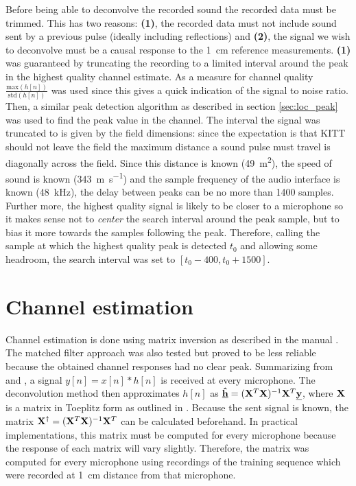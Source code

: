 \documentclass[11pt,titlepage]{report}
\begin{document}
Before being able to deconvolve the recorded sound the recorded data must be trimmed. This has two reasons: \textbf{(1)}, the recorded data must not include sound sent by a previous pulse (ideally including reflections) and \textbf{(2)}, the signal we wish to deconvolve must be a causal response to the \SI{1}{\centi\meter} reference measurements. \textbf{(1)} was guaranteed by truncating the recording to a limited interval around the peak in the highest quality channel estimate. As a measure for channel quality $\frac{\text{max}(h[n])}{\text{std}(h[n])}$ was used since this gives a quick indication of the signal to noise ratio. Then, a similar peak detection algorithm as described in section \ref{sec:loc_peak} was used to find the peak value in the channel. The interval the signal was truncated to is given by the field dimensions: since the expectation is that KITT should not leave the field the maximum distance a sound pulse must travel is diagonally across the field. Since this distance is known (\SI{49}{\meter\squared}), the speed of sound is known (\SI{343}{\meter\per\second}) and the sample frequency of the audio interface is known (\SI{48}{\kilo\hertz}), the delay between peaks can be no more than \num{1400} samples. Further more, the highest quality signal is likely to be closer to a microphone so it makes sense not to \textit{center} the search interval around the peak sample, but to bias it more towards the samples following the peak. Therefore, calling the sample at which the highest quality peak is detected $t_0$ and allowing some headroom, the search interval was set to $[t_0 - 400, t_0 +1500]$.












\section{Channel estimation}
\label{sec:loc_est_h}
Channel estimation is done using matrix inversion as described in the manual \cite{epo4-manual}. The matched filter approach was also tested but proved to be less reliable because the obtained channel responses had no clear peak. Summarizing from \cite{epo4-manual} and \cite{epo4-del7}, a signal $y[n]=x[n]*h[n]$ is received at every microphone. The deconvolution method then approximates $h[n]$ as $\mathbf{\underline{\hat{h}}}=(\mathbf{X}^T\mathbf{X})^{-1}\mathbf{X}^T\mathbf{\underline{y}}$, where $\mathbf{X}$ is a matrix in Toeplitz form as outlined in \cite{epo4-manual}. Because the sent signal is known, the matrix $\mathbf{X}^\dagger=(\mathbf{X}^T\mathbf{X})^{-1}\mathbf{X}^T$ can be calculated beforehand. In practical implementations, this matrix must be computed for every microphone because the response of each matrix will vary slightly. Therefore, the matrix was computed for every microphone using recordings of the training sequence which were recorded at \SI{1}{cm} distance from that microphone.
\end{document}
